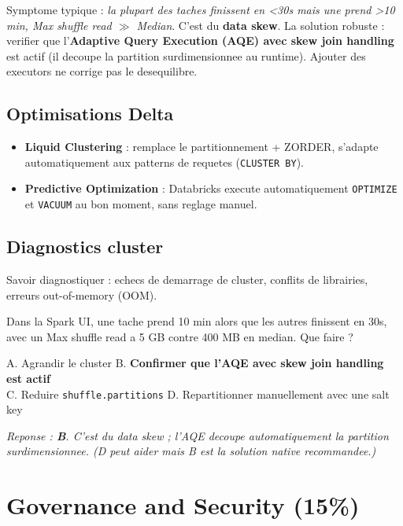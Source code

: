 \documentclass[11pt,a4paper]{article}
\begin{document}
\begin{piege}
Symptome typique : \emph{la plupart des taches finissent en <30s mais une prend >10 min,
Max shuffle read $\gg$ Median}. C'est du \textbf{data skew}. La solution robuste :
verifier que l'\textbf{Adaptive Query Execution (AQE) avec skew join handling} est actif
(il decoupe la partition surdimensionnee au runtime). Ajouter des executors ne corrige
pas le desequilibre.
\end{piege}

\subsection{Optimisations Delta}

\begin{itemize}[leftmargin=*,nosep]
  \item \textbf{Liquid Clustering} : remplace le partitionnement + ZORDER, s'adapte
  automatiquement aux patterns de requetes (\texttt{CLUSTER BY}).
  \item \textbf{Predictive Optimization} : Databricks execute automatiquement \texttt{OPTIMIZE}
  et \texttt{VACUUM} au bon moment, sans reglage manuel.
\end{itemize}

\subsection{Diagnostics cluster}

Savoir diagnostiquer : echecs de demarrage de cluster, conflits de librairies,
erreurs out-of-memory (OOM).

\begin{qcm}
Dans la Spark UI, une tache prend 10 min alors que les autres finissent en 30s, avec un
Max shuffle read a 5 GB contre 400 MB en median. Que faire ?

\smallskip
A. Agrandir le cluster \hfill
B. \textbf{Confirmer que l'AQE avec skew join handling est actif} \\
C. Reduire \texttt{shuffle.partitions} \hfill
D. Repartitionner manuellement avec une salt key

\smallskip
\textit{Reponse : \textbf{B}. C'est du data skew ; l'AQE decoupe automatiquement la partition
surdimensionnee. (D peut aider mais B est la solution native recommandee.)}
\end{qcm}

\section{Governance and Security (15\%)}
\end{document}
